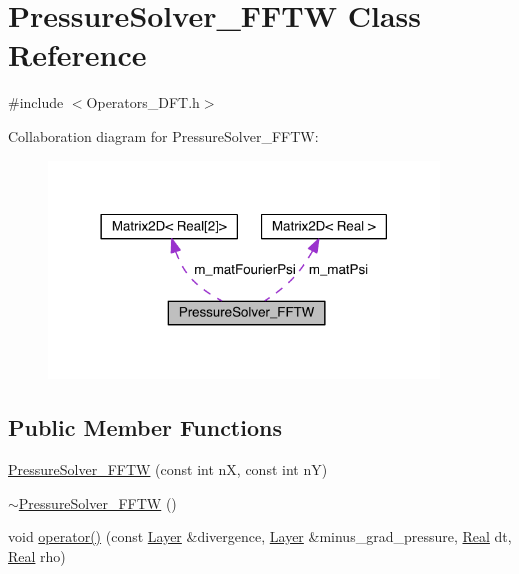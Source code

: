 \hypertarget{class_pressure_solver___f_f_t_w}{}\section{Pressure\+Solver\+\_\+\+F\+F\+T\+W Class Reference}
\label{class_pressure_solver___f_f_t_w}


{\ttfamily \#include $<$Operators\+\_\+\+D\+F\+T.\+h$>$}



Collaboration diagram for Pressure\+Solver\+\_\+\+F\+F\+T\+W\+:\nopagebreak
\begin{figure}[H]
\begin{center}
\leavevmode
\includegraphics[width=294pt]{d4/d91/class_pressure_solver___f_f_t_w__coll__graph}
\end{center}
\end{figure}
\subsection*{Public Member Functions}
\begin{DoxyCompactItemize}
\item 
\hyperlink{class_pressure_solver___f_f_t_w_ac54b726cacfeec644685f98722f6480c}{Pressure\+Solver\+\_\+\+F\+F\+T\+W} (const int n\+X, const int n\+Y)
\item 
\hyperlink{class_pressure_solver___f_f_t_w_ab241e86be401eb5471d610f39c3a7a74}{$\sim$\+Pressure\+Solver\+\_\+\+F\+F\+T\+W} ()
\item 
void \hyperlink{class_pressure_solver___f_f_t_w_ae44fe0bfd308ae294dbe0f61d9b43a20}{operator()} (const \hyperlink{struct_layer}{Layer} \&divergence, \hyperlink{struct_layer}{Layer} \&minus\+\_\+grad\+\_\+pressure, \hyperlink{_h_d_f5_dumper_8h_a445a5f0e2a34c9d97d69a3c2d1957907}{Real} dt, \hyperlink{_h_d_f5_dumper_8h_a445a5f0e2a34c9d97d69a3c2d1957907}{Real} rho)
\end{DoxyCompactItemize}
